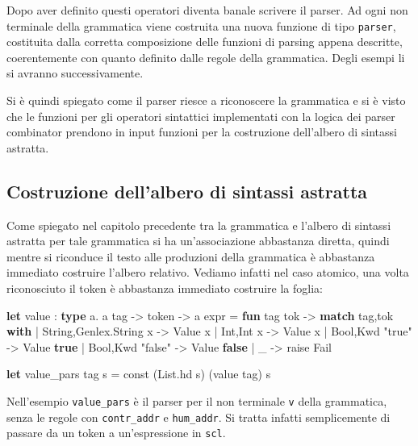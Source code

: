 \documentclass[]{article}
\newenvironment{Shaded}{}{}
\newcommand{\DataTypeTok}[1]{\textcolor[rgb]{0.56,0.13,0.00}{#1}}
\newcommand{\KeywordTok}[1]{\textcolor[rgb]{0.00,0.44,0.13}{\textbf{#1}}}
\newcommand{\NormalTok}[1]{#1}
\newcommand{\StringTok}[1]{\textcolor[rgb]{0.25,0.44,0.63}{#1}}
\begin{document}
Dopo aver definito questi operatori diventa banale scrivere il parser.
Ad ogni non terminale della grammatica viene costruita una nuova
funzione di tipo \texttt{parser}, costituita dalla corretta composizione
delle funzioni di parsing appena descritte, coerentemente con quanto
definito dalle regole della grammatica. Degli esempi li si avranno
successivamente.

Si è quindi spiegato come il parser riesce a riconoscere la grammatica e
si è visto che le funzioni per gli operatori sintattici implementati con
la logica dei parser combinator prendono in input funzioni per la
costruzione dell'albero di sintassi astratta.

\hypertarget{costruzione-dellalbero-di-sintassi-astratta}{%
\subsection{Costruzione dell'albero di sintassi
astratta}\label{costruzione-dellalbero-di-sintassi-astratta}}

Come spiegato nel capitolo precedente tra la grammatica e l'albero di
sintassi astratta per tale grammatica si ha un'associazione abbastanza
diretta, quindi mentre si riconduce il testo alle produzioni della
grammatica è abbastanza immediato costruire l'albero relativo. Vediamo
infatti nel caso atomico, una volta riconosciuto il token è abbastanza
immediato costruire la foglia:

\begin{Shaded}
\begin{Highlighting}[]
\KeywordTok{let}\NormalTok{ value : }\KeywordTok{type}\NormalTok{ a. a tag -> token -> a expr = }\KeywordTok{fun}\NormalTok{ tag tok ->}
 \KeywordTok{match}\NormalTok{ tag,tok }\KeywordTok{with}
\NormalTok{ | }\DataTypeTok{String}\NormalTok{,}\DataTypeTok{Genlex}\NormalTok{.}\DataTypeTok{String}\NormalTok{ x -> Value x}
\NormalTok{ | Int,Int x -> Value x}
\NormalTok{ | Bool,Kwd }\StringTok{"true"}\NormalTok{ -> Value }\KeywordTok{true}
\NormalTok{ | Bool,Kwd }\StringTok{"false"}\NormalTok{ -> Value }\KeywordTok{false}
\NormalTok{ | _ -> }\DataTypeTok{raise}\NormalTok{ Fail}

\KeywordTok{let}\NormalTok{ value_pars tag s = const (}\DataTypeTok{List}\NormalTok{.hd s) (value tag) s}
\end{Highlighting}
\end{Shaded}

Nell'esempio \texttt{value\_pars} è il parser per il non terminale
\texttt{v} della grammatica, senza le regole con \texttt{contr\_addr} e
\texttt{hum\_addr}. Si tratta infatti semplicemente di passare da un
token a un'espressione in \texttt{scl}.
\end{document}
